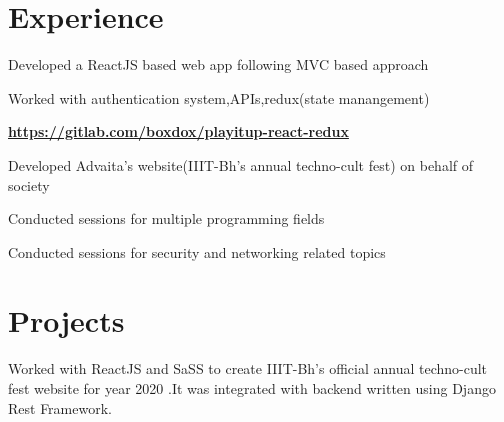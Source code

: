 \documentclass[]{deedy-resume-openfont}
\begin{document}
\begin{minipage}[t]{0.63\textwidth} 


\section{Experience}
\vspace{\topsep} %
\begin{tightemize}
\item Developed a ReactJS based web app following MVC based approach
\item Worked with authentication system,APIs,redux(state manangement)
\item \textbf{\href{https://gitlab.com/boxdox/playitup-react-redux}{https://gitlab.com/boxdox/playitup-react-redux}}
\end{tightemize}
\sectionsep

\begin{tightemize}
\item Developed Advaita's website(IIIT-Bh's annual techno-cult fest) on behalf of society
\item Conducted sessions for multiple programming fields
\end{tightemize}
\sectionsep

\begin{tightemize}
\item Conducted sessions for security and networking related topics
\end{tightemize}
\sectionsep


\section{Projects}
 Worked with ReactJS and SaSS to create IIIT-Bh's official annual techno-cult fest website for year 2020 .It was integrated with backend written using Django Rest Framework. 


\end{minipage}
\end{document}
